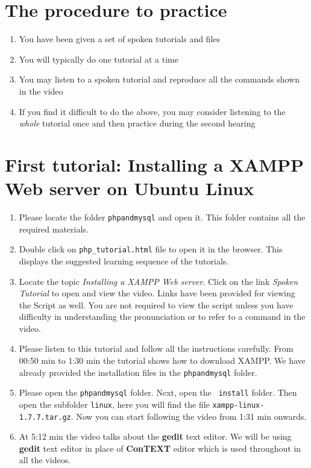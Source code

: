\documentclass[11pt]{article}
\newenvironment{enumcpt}{\begin{enumerate} \topsep 0pt \partopsep 0pt 
    \parsep 0pt
    \itemsep 0pt \leftmargin -1in \rightmargin 0pt
}{\end{enumerate}}
\begin{document}
\begin{multicols}{2}

  \section{The procedure to practice}
  \begin{enumcpt}
  \item You have been given a set of spoken tutorials and files
  \item You will typically do one tutorial at a time
  \item You may listen to a spoken tutorial and reproduce all the commands shown in the video
  \item If you find it difficult to do the above, you may consider
    listening to the \emph{whole} tutorial once and then practice during
    the second hearing
  \end{enumcpt}

  \section{First tutorial: Installing a XAMPP Web server on Ubuntu Linux}
\begin{enumcpt}
\item Please locate the folder {\tt phpandmysql} and open it. This
  folder contains all the required materials.
\item Double click on {\tt php\_tutorial.html} file to open it in the
  browser.  This displays the suggested learning sequence of the
  tutorials.
\item Locate the topic \emph{Installing a XAMPP Web server}. Click on the link \emph{Spoken Tutorial} to open and view
  the video.  Links have been provided for viewing the Script as well.  You are not required to view the script unless you
  have difficulty in understanding the pronunciation or to refer to a
  command in the video.
\item Please listen to this tutorial and follow all the instructions
  carefully. From 00:50 min to 1:30 min the tutorial shows how to
  download XAMPP. We have already provided the installation files in
  the {\tt phpandmysql} folder.
\item Please open the {\tt phpandmysql} folder. Next, open the {\tt
  install} folder.  Then open the subfolder {\tt linux}, here you will find the file {\tt xampp-linux-1.7.7.tar.gz}.  Now you
  can start following the video from 1:31 min onwards.
\item At 5:12 min the video talks about the \textbf{gedit} text
  editor. We will be using \textbf{gedit} text editor in place of \textbf{ConTEXT} editor which is used throughout in all the
  videos.


\end{enumcpt}
\end{multicols}
\end{document}
